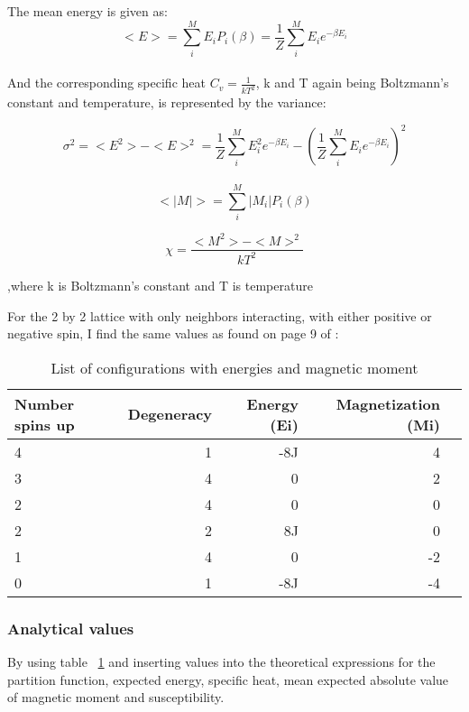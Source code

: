 The mean energy is given as:
\begin{equation}
<E> = \sum_i^ME_iP_i(\beta) = \frac{1}{Z}\sum_i^ME_ie^{-\beta E_i}
\end{equation}\\


And the corresponding specific heat $C_v=\frac{1}{kT^2}$, k and T again being Boltzmann's constant and temperature, is represented by the variance:

\begin{equation}
\sigma^2 = <E^2> - <E>^2 = \frac{1}{Z}\sum_i^ME_i^2e^{-\beta E_i}-(\frac{1}{Z}\sum_i^ME_ie^{-\beta E_i})^2
\end{equation}\\

\begin{equation}
<|M|> = \sum_i^M|M_i|P_i(\beta)
\end{equation}


\begin{equation}
\chi = \frac{<M^2> - <M>^2}{kT^2}
\end{equation}

,where k is Boltzmann's constant and T is temperature

For the 2 by 2 lattice with only neighbors interacting, with either positive or negative spin, I find the same values as found on page 9 of \cite{isingstat}:


\FloatBarrier
\begin{table}

\begin{tabular}{lrrrr}
\toprule
Number spins up &  Degeneracy &  Energy (Ei) &  Magnetization (Mi) \\
\midrule
4 &      1 &      -8J &        4 \\
3 &      4 &      0 &        2 \\
2 &      4 &      0 &        0 \\
2 &      2 &      8J &        0 \\
1 &      4 &      0 &        -2 \\
0 &      1 &      -8J &        -4 \\
\bottomrule

\end{tabular}

\caption{List of configurations with energies and magnetic moment}
\label{tab:Configurations_energy_magnetic}
\end{table}
\FloatBarrier


\subsubsection{Analytical values}
By using table ~\ref{tab:Configurations_energy_magnetic} and inserting values into the theoretical expressions for the partition function, expected energy, specific heat, mean expected absolute value of magnetic moment and susceptibility.\\


